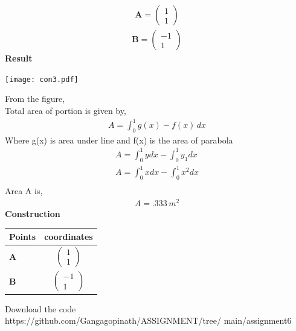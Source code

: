 \documentclass[10pt,a4paper]{report}
\newcommand{\myvec}[1]{\ensuremath{\begin{pmatrix}#1\end{pmatrix}}}
\let\vec\mathbf
\let\vec\mathbf
\begin{document}
\begin{multicols}{2}
\begin{align}
    \vec{A}=\myvec{
1\\
1
    }
\end{align}
\begin{align}
    \vec{B}=\myvec{
-1\\
1
    }
\end{align}
\textbf{Result}
\begin{center}
 \texttt{[image: con3.pdf]}  
 \end{center}\vspace{1mm}
 From the figure,\\ \vspace{1mm}
Total area of portion is given by, \\ \vspace{1mm}
\begin{align}
 A=  \int_{0}^{1} g(x)-f(x) \,dx 
\end{align}
Where g(x) is area under line and f(x) is the area of parabola \\ \vspace{1mm}
\begin{align}
A= \int_{0}^{1} y dx -\int_{0}^{1} y_1 dx  \\
A= \int_{0}^{1} x dx -\int_{0}^{1} x^2 dx  \\
\end{align}
Area A is,\\ 
\begin{align}
    A= .333\,m^2
\end{align}
 \vspace{2mm} \textbf{Construction}
\begin{center}
\setlength{\arrayrulewidth}{0.5mm}
\setlength{\tabcolsep}{6pt}
\renewcommand{\arraystretch}{1.5}
    \begin{tabular}{|l|c|}
    \hline 
    \textbf{Points} & \textbf{coordinates} \\ \hline
   $\vec{A}$ & $\myvec{
   1\\
   1
   } $ \\ \hline
   $\vec{B}$ & $\myvec{
   -1\\
   1
   } $ \\\hline
      \end{tabular}
  \end{center}

\raggedright  Download the code \\
https://github.com/Gangagopinath/ASSIGNMENT/tree/
\newline
main/assignment6
  \end{multicols}
\end{document}
